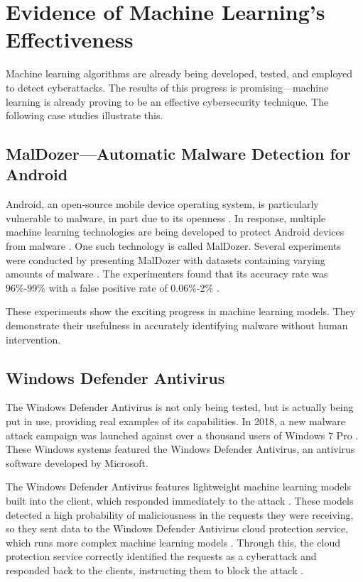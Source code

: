 \section{Evidence of Machine Learning's Effectiveness}
Machine learning algorithms are already being developed, tested, and employed to detect cyberattacks.
The results of this progress is promising---machine learning is already proving to be an effective cybersecurity technique.
The following case studies illustrate this.

\subsection{MalDozer---Automatic Malware Detection for Android}
Android, an open-source mobile device operating system, is particularly vulnerable to malware, in part due to its openness \cite{sustainablecities2021}.
In response, multiple machine learning technologies are being developed to protect Android devices from malware \cite{sustainablecities2021}.
One such technology is called MalDozer.
Several experiments were conducted by presenting MalDozer with datasets containing varying amounts of malware \cite{sustainablecities2021}.
The experimenters found that its accuracy rate was 96\%-99\% with a false positive rate of 0.06\%-2\% \cite{sustainablecities2021}.

These experiments show the exciting progress in machine learning models.
They demonstrate their usefulness in accurately identifying malware without human intervention.

\subsection{Windows Defender Antivirus}
The Windows Defender Antivirus is not only being tested, but is actually being put in use, providing real examples of its capabilities.
In 2018, a new malware attack campaign was launched against over a thousand users of Windows 7 Pro \cite{microsoft2018}.
These Windows systems featured the Windows Defender Antivirus, an antivirus software developed by Microsoft.

The Windows Defender Antivirus features lightweight machine learning models built into the client, which responded immediately to the attack \cite{microsoft2018}.
These models detected a high probability of maliciousness in the requests they were receiving, so they sent data to the Windows Defender Antivirus cloud protection service, which runs more complex machine learning models \cite{microsoft2018}.
Through this, the cloud protection service correctly identified the requests as a cyberattack and responded back to the clients, instructing them to block the attack \cite{microsoft2018}.

